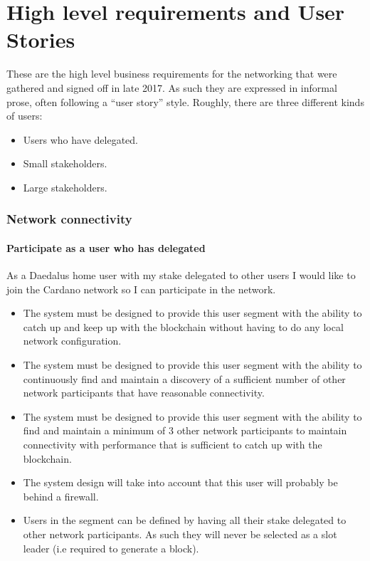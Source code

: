 \documentclass{report}
\newcommand{\wip}[1]{}
\theoremstyle{definition}{
  \newtheorem{lemma}{Lemma}[section] %
  \newtheorem{definition}[lemma]{Definition}
}
\theoremstyle{theorem}{
  \newtheorem{invariant}[lemma]{Invariant}
  \newtheorem{proofobligation}[lemma]{Proof Obligation}
}
\numberwithin{equation}{lemma}
\begin{document}
\wip{TODO:extended abstract, scope of the document}

\section{High level requirements and User Stories}

These are the high level business requirements for the networking that were
gathered and signed off in late 2017. As such they are expressed in informal
prose, often following a ``user story'' style.
Roughly, there are three different kinds of users:
\begin{itemize}
\item Users who have delegated.
\item Small stakeholders.
\item Large stakeholders.
\end{itemize}

\subsubsection{Network connectivity}\label{network-connectivity}

\paragraph{Participate as a user who has delegated}

As a Daedalus home user with my stake delegated to other users
I would like to join the Cardano network so I can participate in the network.
\begin{itemize}
\item The system must be designed to provide this user segment with the ability
      to catch up and keep up with the blockchain without having
      to do any local network configuration.
\item The system must be designed to provide this user segment with the ability to
      continuously find and maintain a discovery of a sufficient number of
      other network participants that have reasonable connectivity.
\item The system must be designed to provide this user segment with the ability to
      find and maintain a minimum of 3 other network participants to maintain
      connectivity with performance that is sufficient to catch up with the
      blockchain.
\item The system design will take into account that this user will probably be
      behind a firewall.
\item Users in the segment can be defined by having all their stake
      delegated to other network participants.
      As such they will never be selected as a slot leader (i.e required to generate a block).
\end{itemize}
\end{document}
